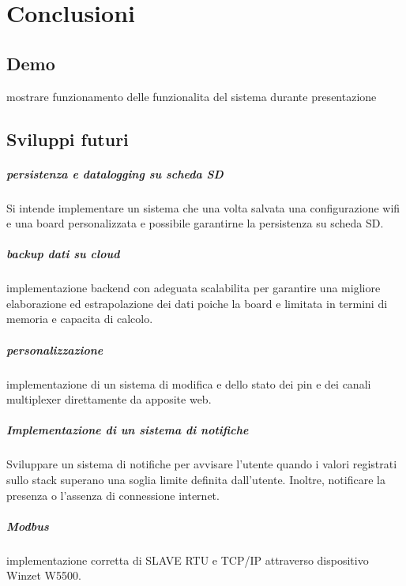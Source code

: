 \documentclass[12pt,a4paper]{report}
\begin{document}
\chapter{Conclusioni}
\section{Demo}
mostrare funzionamento delle funzionalita del sistema durante presentazione
\section{Sviluppi futuri}
\paragraph{persistenza e datalogging su scheda SD}
Si intende implementare un sistema che una volta salvata una configurazione wifi  e una board personalizzata e possibile garantirne la persistenza su scheda SD.

\paragraph{backup dati su cloud} implementazione backend con adeguata scalabilita
per garantire una migliore elaborazione ed estrapolazione dei dati poiche la board e limitata in termini di memoria e capacita di calcolo.

\paragraph{personalizzazione}
implementazione di un sistema di modifica e  dello stato dei pin e dei canali multiplexer direttamente da apposite web.

\paragraph{Implementazione di un sistema di notifiche}
Sviluppare un sistema di notifiche per avvisare l'utente quando i valori registrati sullo stack superano una soglia limite definita dall'utente. Inoltre, notificare la presenza o l'assenza di connessione internet.

\paragraph{Modbus}
implementazione corretta di SLAVE RTU e TCP/IP attraverso dispositivo Winzet W5500.
\end{document}
